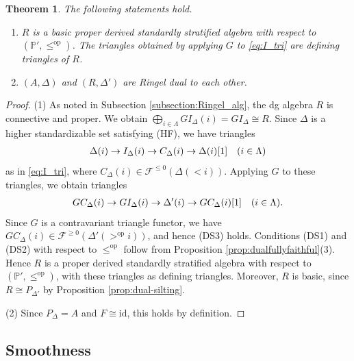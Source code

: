 \documentclass[a4paper,reqno,11pt]{amsart}
\numberwithin{equation}{section}
\newtheorem{theorem}{Theorem}[section]
\theoremstyle{definition}
\newcommand{\F}{\mathcal{F}}
\newcommand{\PP}{\mathbb{P}}
\newcommand{\bde}{\Delta}
\newcommand{\id}{\mathrm{id}}
\newcommand{\op}{\mathrm{op}}
\begin{document}
\begin{theorem}\label{thm:Ringel_dss}
The following statements hold.
\begin{enumerate}
\item $R$ is a basic proper derived standardly stratified algebra with respect to $(\PP',\leq^{\op})$.
The triangles obtained by applying $G$ to \eqref{eq:I_tri} are defining triangles of $R$.
\item $(A,\bde)$ and $(R,\bde')$ are Ringel dual to each other.
\end{enumerate}
\end{theorem}
\begin{proof}
(1) As noted in Subsection \ref{subsection:Ringel_alg}, the dg algebra $R$ is connective and proper.
We obtain $\bigoplus_{i\in\Lambda}GI_{\bde}(i)=GI_{\bde}\cong R$.
Since $\bde$ is a higher standardizable set satisfying (HF), we have triangles
\begin{align}
\bde(i)\to I_{\bde}(i)\to C_{\bde}(i)\to\bde(i)[1]\quad(i\in\Lambda)\notag
\end{align}
as in \eqref{eq:I_tri}, where $C_{\bde}(i)\in\F^{\leq 0}(\bde(<i))$.
Applying $G$ to these triangles, we obtain triangles
\begin{align}
GC_{\bde}(i)\to GI_{\bde}(i)\to\bde'(i)\to GC_{\bde}(i)[1]\quad(i\in\Lambda).\notag
\end{align}
Since $G$ is a contravariant triangle functor, we have $GC_{\bde}(i)\in\F^{\geq 0}(\bde'(>^{\op}i))$, and hence (DS3) holds.
Conditions (DS1) and (DS2) with respect to $\leq^{\op}$ follow from Proposition \ref{prop:dualfullyfaithful}(3).
Hence $R$ is a proper derived standardly stratified algebra with respect to $(\PP',\leq^{\op})$, with these triangles as defining triangles.
Moreover, $R$ is basic, since $R\cong P_{\bde'}$ by Proposition \ref{prop:dual-silting}.

(2) Since $P_{\bde}=A$ and $F\cong\id$, this holds by definition.
\end{proof}



\subsection{Smoothness}
\end{document}
